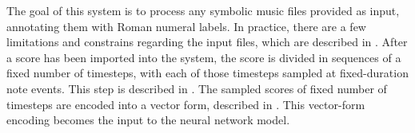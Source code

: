 

The goal of this system is to process any symbolic music
files provided as input, annotating them with Roman numeral
labels. In practice, there are a few limitations and
constrains regarding the input files, which are described in
. After a score has been imported
into the system, the score is divided in sequences of a
fixed number of timesteps, with each of those timesteps
sampled at fixed-duration note events. This step is
described in . The sampled
scores of fixed number of timesteps are encoded into a
vector form, described in .
This vector-form encoding becomes the input to the neural
network model.